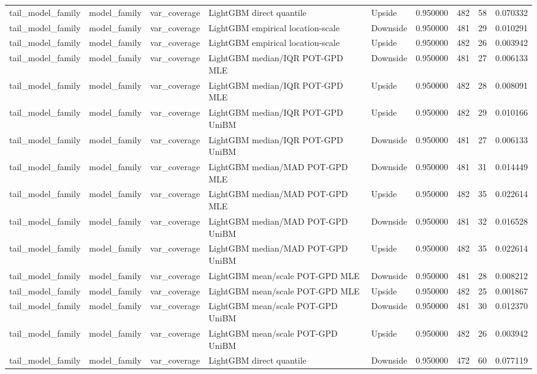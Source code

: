 \begin{tabular}{lllllrrr}
tail\_model\_family & model\_family & var\_coverage & LightGBM direct quantile & Upside & 0.950000 & 482 & 58 & 0.070332 \\
tail\_model\_family & model\_family & var\_coverage & LightGBM empirical location-scale & Downside & 0.950000 & 481 & 29 & 0.010291 \\
tail\_model\_family & model\_family & var\_coverage & LightGBM empirical location-scale & Upside & 0.950000 & 482 & 26 & 0.003942 \\
tail\_model\_family & model\_family & var\_coverage & LightGBM median/IQR POT-GPD MLE & Downside & 0.950000 & 481 & 27 & 0.006133 \\
tail\_model\_family & model\_family & var\_coverage & LightGBM median/IQR POT-GPD MLE & Upside & 0.950000 & 482 & 28 & 0.008091 \\
tail\_model\_family & model\_family & var\_coverage & LightGBM median/IQR POT-GPD UniBM & Upside & 0.950000 & 482 & 29 & 0.010166 \\
tail\_model\_family & model\_family & var\_coverage & LightGBM median/IQR POT-GPD UniBM & Downside & 0.950000 & 481 & 27 & 0.006133 \\
tail\_model\_family & model\_family & var\_coverage & LightGBM median/MAD POT-GPD MLE & Downside & 0.950000 & 481 & 31 & 0.014449 \\
tail\_model\_family & model\_family & var\_coverage & LightGBM median/MAD POT-GPD MLE & Upside & 0.950000 & 482 & 35 & 0.022614 \\
tail\_model\_family & model\_family & var\_coverage & LightGBM median/MAD POT-GPD UniBM & Downside & 0.950000 & 481 & 32 & 0.016528 \\
tail\_model\_family & model\_family & var\_coverage & LightGBM median/MAD POT-GPD UniBM & Upside & 0.950000 & 482 & 35 & 0.022614 \\
tail\_model\_family & model\_family & var\_coverage & LightGBM mean/scale POT-GPD MLE & Downside & 0.950000 & 481 & 28 & 0.008212 \\
tail\_model\_family & model\_family & var\_coverage & LightGBM mean/scale POT-GPD MLE & Upside & 0.950000 & 482 & 25 & 0.001867 \\
tail\_model\_family & model\_family & var\_coverage & LightGBM mean/scale POT-GPD UniBM & Downside & 0.950000 & 481 & 30 & 0.012370 \\
tail\_model\_family & model\_family & var\_coverage & LightGBM mean/scale POT-GPD UniBM & Upside & 0.950000 & 482 & 26 & 0.003942 \\
tail\_model\_family & model\_family & var\_coverage & LightGBM direct quantile & Downside & 0.950000 & 472 & 60 & 0.077119 \\

\end{tabular}
